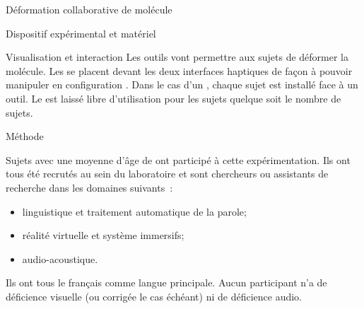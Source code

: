 \documentclass[myfrancais]{mythesis}
\begin{document}
\begin{mychapter}{Déformation collaborative de molécule}
\begin{mysection}{Dispositif expérimental et matériel}
\begin{mysubsection}{Visualisation et interaction}
				Les outils  vont permettre aux sujets de déformer la molécule.
				Les  se placent devant les deux interfaces haptiques de façon à pouvoir manipuler en configuration .
				Dans le cas d'un , chaque sujet est installé face à un outil.
				Le \mySpaceNavigator est laissé libre d'utilisation pour les sujets quelque soit le nombre de sujets.
			\end{mysubsection}
		\end{mysection}
		\begin{mysection}{Méthode}
			\begin{mysubsection}{Sujets}
				 avec une moyenne d'âge de  ont participé à cette expérimentation.
				Ils ont tous été recrutés au sein du laboratoire  et sont chercheurs ou assistants de recherche dans les domaines suivants~:
				\begin{itemize}
					\item linguistique et traitement automatique de la parole;
					\item réalité virtuelle et système immersifs;
					\item audio-acoustique.
				\end{itemize}
				Ils ont tous le français comme langue principale.
				Aucun participant n'a de déficience visuelle (ou corrigée le cas échéant) ni de déficience audio.


\end{mysubsection}
\end{mysection}
\end{mychapter}
\end{document}

